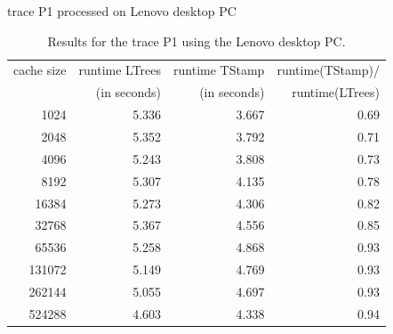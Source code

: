 \documentclass[a4paper,12pt, titlepage]{article}  %
\begin{document}
\begin{table}[p]
\begin{center}
	trace P1 processed on Lenovo desktop PC
	\begin{tabular}{|r||r|r|r|}
	  	\hline
                cache size                               &     runtime LTrees         &      runtime TStamp          &  runtime(TStamp)/ \\
                                                             &      (in seconds)            &      (in seconds)                 & runtime(LTrees)     \\
                \hline
                1024			             &              5.336                &            3.667                        &          0.69              \\
		2048					     &      5.352                        &      3.792                              &    0.71                   \\								
		4096					     &      5.243                        &      3.808                              &     0.73                   \\	
		8192					     &      5.307                        &      4.135                              &     0.78                   \\	
		16384				     &      5.273                        &      4.306                              &     0.82                   \\	
		32768				     &      5.367                        &      4.556                              &     0.85                   \\	
		65536				     &      5.258                        &      4.868                              &     0.93                   \\	
		131072				     &      5.149                        &      4.769                              &     0.93                   \\	
		262144				     &      5.055                        &      4.697                              &     0.93                   \\	
		524288				     &      4.603                        &      4.338                              &     0.94                   \\
                \hline
	\end{tabular}
	\caption{Results for the trace P1 using the Lenovo desktop PC.}
        \label{tab:lenovo_P1}
\end{center}
\end{table}
\end{document}
